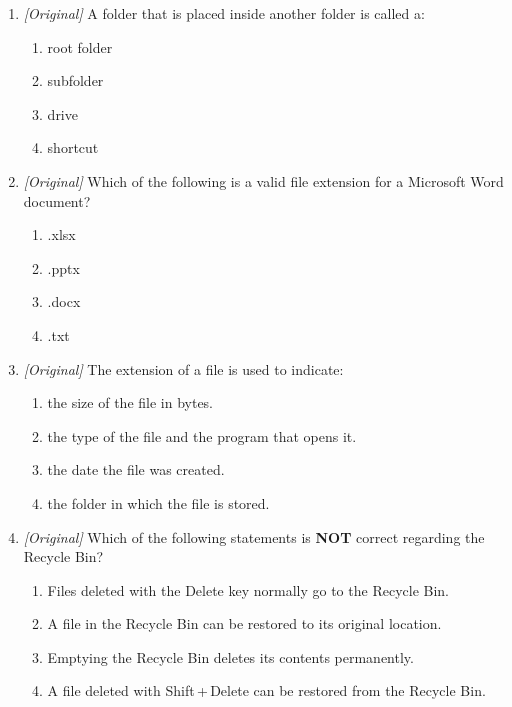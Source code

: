 \begin{enumerate}[label=\textbf{Q\arabic*.}, leftmargin=*]
\begin{enumerate}[label=\Alph*.]
    \item a backslash (\textbackslash)
    \item a colon (:)
    \item a full stop (.)
  \end{enumerate}
\item \textit{[Original]} A folder that is placed inside another folder is
  called a:
  \begin{enumerate}[label=\Alph*.]
    \item root folder
    \item subfolder
    \item drive
    \item shortcut
  \end{enumerate}
\item \textit{[Original]} Which of the following is a valid file extension
  for a Microsoft Word document?
  \begin{enumerate}[label=\Alph*.]
    \item .xlsx
    \item .pptx
    \item .docx
    \item .txt
  \end{enumerate}
\item \textit{[Original]} The extension of a file is used to indicate:
  \begin{enumerate}[label=\Alph*.]
    \item the size of the file in bytes.
    \item the type of the file and the program that opens it.
    \item the date the file was created.
    \item the folder in which the file is stored.
  \end{enumerate}
\item \textit{[Original]} Which of the following statements is \textbf{NOT}
  correct regarding the Recycle Bin?
  \begin{enumerate}[label=\Alph*.]
    \item Files deleted with the Delete key normally go to the Recycle Bin.
    \item A file in the Recycle Bin can be restored to its original location.
    \item Emptying the Recycle Bin deletes its contents permanently.
    \item A file deleted with Shift\,+\,Delete can be restored from the
      Recycle Bin.
  \end{enumerate}

\end{enumerate}

